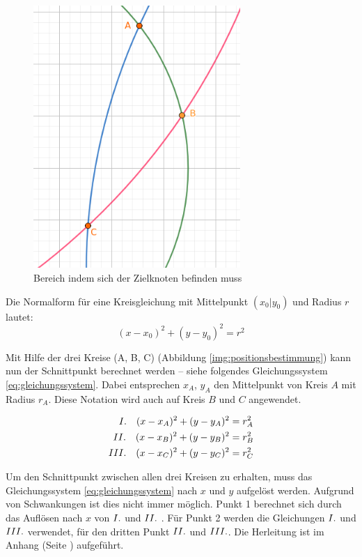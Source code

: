 \begin{figure}[H]
        \centering
        \includegraphics[width=0.7\textwidth]{images/positionsbestimmung_flaeche.png}
        \caption{Bereich indem sich der Zielknoten befinden muss}
        \label{img:schwankungen}
\end{figure}

Die Normalform für eine Kreisgleichung mit Mittelpunkt $(x_{0}|y_{0})$ und Radius $r$ lautet:
\begin{equation}
(x-x_{0})^{2}+(y-y_{0})^{2} = r^{2}
\end{equation}

Mit Hilfe der drei Kreise (A, B, C) (Abbildung \ref{img:positionsbestimmung}) kann nun der Schnittpunkt berechnet werden -- siehe folgendes Gleichungssystem \ref{eq:gleichungssystem}. Dabei entsprechen $x_{A}$, $y_{A}$ den Mittelpunkt von Kreis $A$ mit Radius $r_{A}$. Diese Notation wird auch auf Kreis $B$ und $C$ angewendet.

\begin{equation} \label{eq:gleichungssystem}
\begin{split}
\RM{1} \quad (x-x_{A})^{2}+(y-y_{A})^{2} &= r_{A}^{2} \\
\RM{2} \quad (x-x_{B})^{2}+(y-y_{B})^{2} &= r_{B}^{2} \\
\RM{3} \quad (x-x_{C})^{2}+(y-y_{C})^{2} &= r_{C}^{2}
\end{split}
\end{equation}

Um den Schnittpunkt zwischen allen drei Kreisen zu erhalten, muss das Gleichungssystem \ref{eq:gleichungssystem} nach $x$ und $y$ aufgelöst werden. Aufgrund von Schwankungen ist dies nicht immer möglich. Punkt \si{1} berechnet sich durch das Auflösen nach $x$ von $\RM{1}$ und $\RM{2}$ . Für Punkt \si{2} werden die Gleichungen $\RM{1}$ und $\RM{3}$ verwendet, für den dritten Punkt $\RM{2}$ und $\RM{3}$. Die Herleitung ist im Anhang (Seite \pageref{sec:abcdef}) aufgeführt.

